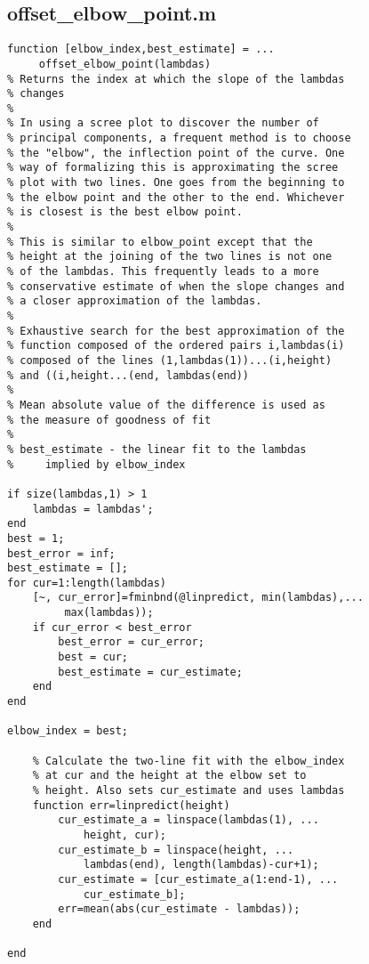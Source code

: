 \documentclass[eric_thesis.tex]{subfiles}
\begin{document}
\subsection{offset\_elbow\_point.m}
\begin{lstlisting}
function [elbow_index,best_estimate] = ...
     offset_elbow_point(lambdas)
% Returns the index at which the slope of the lambdas 
% changes
%
% In using a scree plot to discover the number of 
% principal components, a frequent method is to choose
% the "elbow", the inflection point of the curve. One
% way of formalizing this is approximating the scree 
% plot with two lines. One goes from the beginning to
% the elbow point and the other to the end. Whichever
% is closest is the best elbow point.
%
% This is similar to elbow_point except that the
% height at the joining of the two lines is not one
% of the lambdas. This frequently leads to a more
% conservative estimate of when the slope changes and
% a closer approximation of the lambdas.
%
% Exhaustive search for the best approximation of the
% function composed of the ordered pairs i,lambdas(i) 
% composed of the lines (1,lambdas(1))...(i,height)
% and ((i,height...(end, lambdas(end))
%
% Mean absolute value of the difference is used as
% the measure of goodness of fit
%
% best_estimate - the linear fit to the lambdas
%     implied by elbow_index

if size(lambdas,1) > 1
    lambdas = lambdas';
end
best = 1;
best_error = inf;
best_estimate = [];
for cur=1:length(lambdas)
    [~, cur_error]=fminbnd(@linpredict, min(lambdas),...
         max(lambdas));
    if cur_error < best_error
        best_error = cur_error;
        best = cur;
        best_estimate = cur_estimate;
    end
end

elbow_index = best;

    % Calculate the two-line fit with the elbow_index
    % at cur and the height at the elbow set to
    % height. Also sets cur_estimate and uses lambdas
    function err=linpredict(height)
        cur_estimate_a = linspace(lambdas(1), ...
            height, cur);
        cur_estimate_b = linspace(height, ...
            lambdas(end), length(lambdas)-cur+1);
        cur_estimate = [cur_estimate_a(1:end-1), ...
            cur_estimate_b];
        err=mean(abs(cur_estimate - lambdas));
    end

end
\end{lstlisting}
\end{document}
